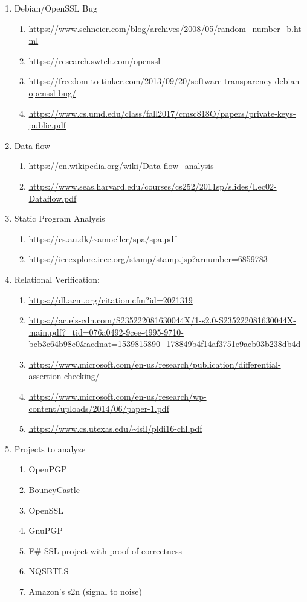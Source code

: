\documentclass[letterpaper,twocolumn,10pt]{article}
\begin{document}
\begin{enumerate}
	\item Debian/OpenSSL Bug 
		\begin{enumerate}
			\item \url{https://www.schneier.com/blog/archives/2008/05/random_number_b.html}
			\item \url{https://research.swtch.com/openssl}
			\item \url{https://freedom-to-tinker.com/2013/09/20/software-transparency-debian-openssl-bug/}
			\item \url{https://www.cs.umd.edu/class/fall2017/cmsc818O/papers/private-keys-public.pdf}
		\end{enumerate}
	\item Data flow
		\begin{enumerate}
			\item \url{https://en.wikipedia.org/wiki/Data-flow_analysis}
			\item \url{https://www.seas.harvard.edu/courses/cs252/2011sp/slides/Lec02-Dataflow.pdf}
		\end{enumerate}
	\item Static Program Analysis
		\begin{enumerate}
            \item \url{https://cs.au.dk/~amoeller/spa/spa.pdf}
            \item \url{https://ieeexplore.ieee.org/stamp/stamp.jsp?arnumber=6859783}
		\end{enumerate}
	\item Relational Verification:
		\begin{enumerate}
			\item \url{https://dl.acm.org/citation.cfm?id=2021319}
			\item \url{https://ac.els-cdn.com/S235222081630044X/1-s2.0-S235222081630044X-main.pdf?_tid=076a0492-9cee-4995-9710-bcb3c64b98e0&acdnat=1539815890_178849b4f14af3751e9acb03b238db4d}
			\item \url{https://www.microsoft.com/en-us/research/publication/differential-assertion-checking/}
			\item \url{https://www.microsoft.com/en-us/research/wp-content/uploads/2014/06/paper-1.pdf}
			\item \url{https://www.cs.utexas.edu/~isil/pldi16-chl.pdf}
		\end{enumerate}
	\item Projects to analyze 
		\begin{enumerate}
			\item OpenPGP
			\item BouncyCastle
			\item OpenSSL
			\item GnuPGP
			\item F\# SSL project with proof of correctness
			\item NQSBTLS
			\item Amazon's s2n (signal to noise)
		\end{enumerate}
\end{enumerate}
\end{document}
